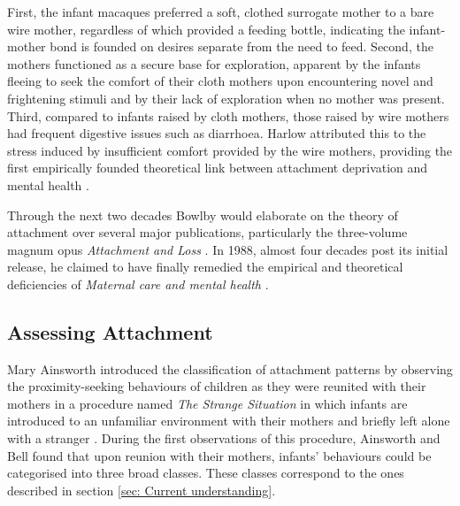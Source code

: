 \documentclass[12pt]{report}
\begin{document}
First, the infant macaques preferred a soft, clothed surrogate mother to a bare wire mother, regardless of which provided a feeding bottle, indicating the infant-mother bond is founded on desires separate from the need to feed.
Second, the mothers functioned as a secure base for exploration, apparent by the infants fleeing to seek the comfort of their cloth mothers upon encountering novel and frightening stimuli and by their lack of exploration when no mother was present.
Third, compared to infants raised by cloth mothers, those raised by wire mothers had frequent digestive issues such as diarrhoea.
Harlow attributed this to the stress induced by insufficient comfort provided by the wire mothers, providing the first empirically founded theoretical link between attachment deprivation and mental health \cite{Harlow1958}.

Through the next two decades Bowlby would elaborate on the theory of attachment over several major publications, particularly the three-volume magnum opus \textit{Attachment and Loss} \cite{Bowlby1969attachment, Bowlby1973separation,Bowlby1980loss}.
In 1988, almost four decades post its initial release, he claimed to have finally remedied the empirical and theoretical deficiencies of \textit{Maternal care and mental health} \cite{Bowlby1988}.

\subsection{Assessing Attachment}
Mary Ainsworth introduced the classification of attachment patterns by observing the proximity-seeking behaviours of children as they were reunited with their mothers in a procedure named \textit{The Strange Situation} in which infants are introduced to an unfamiliar environment with their mothers and briefly left alone with a stranger .
During the first observations of this procedure, Ainsworth and Bell found that upon reunion with their mothers, infants' behaviours could be categorised into three broad classes.
These classes correspond to the ones described in section \ref{sec: Current understanding}.
\end{document}
